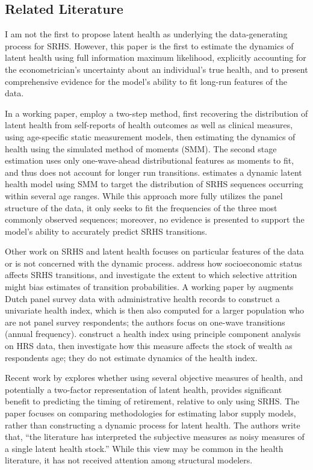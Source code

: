 \documentclass[12pt,pdftex,letterpaper]{article}
\begin{document}
\subsection{Related Literature}\label{sec:Lit}

I am not the first to propose latent health as underlying the data-generating process for SRHS. However, this paper is the first to estimate the dynamics of latent health using full information maximum likelihood, explicitly accounting for the econometrician's uncertainty about an individual's true health, and to present comprehensive evidence for the model's ability to fit long-run features of the data.  

In a working paper, \cite{Lange12} employ a two-step method, first recovering the distribution of latent health from self-reports of health outcomes as well as clinical measures, using age-specific static measurement models, then estimating the dynamics of health using the simulated method of moments (SMM).  The second stage estimation uses only one-wave-ahead distributional features as moments to fit, and thus does not account for longer run transitions.  \cite{Halliday11} estimates a dynamic latent health model using SMM to target the distribution of SRHS sequences occurring within several age ranges.  While this approach more fully utilizes the panel structure of the data, it only seeks to fit the frequencies of the three most commonly observed sequences; moreover, no evidence is presented to support the model's ability to accurately predict SRHS transitions.

Other work on SRHS and latent health focuses on particular features of the data or is not concerned with the dynamic process.  \cite{Contoyannis04} address how socioeconomic status affects SRHS transitions, and investigate the extent to which selective attrition might bias estimates of transition probabilities.  A working paper by \cite{Alessie15} augments Dutch panel survey data with administrative health records to construct a univariate health index, which is then also computed for a larger population who are not panel survey respondents; the authors focus on one-wave transitions (annual frequency). \cite{Poterba17} construct a health index using principle component analysis on HRS data, then investigate how this measure affects the stock of wealth as respondents age; they do not estimate dynamics of the health index.

Recent work by \cite{Blundell17} explores whether using several objective measures of health, and potentially a two-factor representation of latent health, provides significant benefit to predicting the timing of retirement, relative to only using SRHS.  The paper focuses on comparing methodologies for estimating labor supply models, rather than constructing a dynamic process for latent health.  The authors write that, ``the literature has interpreted the subjective measures as noisy measures of a single latent health stock.'' While this view may be common in the health literature, it has not received attention among structural modelers.
\end{document}
